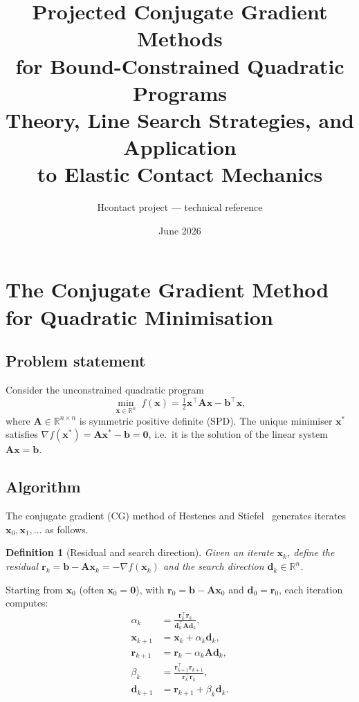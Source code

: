 \documentclass[11pt,a4paper]{article}
\newtheorem{definition}[theorem]{Definition}
\newcommand{\R}{\mathbb{R}}
\newcommand{\bA}{\mathbf{A}}
\newcommand{\bb}{\mathbf{b}}
\newcommand{\br}{\mathbf{r}}
\newcommand{\bd}{\mathbf{d}}
\newcommand{\bx}{\mathbf{x}}
\newcommand{\bzero}{\mathbf{0}}
\newcommand{\tr}{\top}
\begin{document}
\title{\textbf{Projected Conjugate Gradient Methods\\
       for Bound-Constrained Quadratic Programs}\\[0.5em]
       \large Theory, Line Search Strategies, and Application\\
       to Elastic Contact Mechanics}
\author{Hcontact project --- technical reference}
\date{June 2026}
\maketitle
\tableofcontents

\section{The Conjugate Gradient Method for Quadratic Minimisation}
\label{sec:cg}

\subsection{Problem statement}

Consider the unconstrained quadratic program
\begin{equation}
  \min_{\bx \in \R^n}\; f(\bx) = \tfrac{1}{2}\bx^\tr \bA \bx - \bb^\tr \bx,
  \label{eq:qp}
\end{equation}
where $\bA \in \R^{n \times n}$ is symmetric positive definite (SPD).
The unique minimiser $\bx^*$ satisfies $\nabla f(\bx^*) = \bA\bx^* - \bb = \bzero$,
i.e.\ it is the solution of the linear system $\bA\bx = \bb$.

\subsection{Algorithm}

The conjugate gradient (CG) method of Hestenes and Stiefel~\cite{HestStief1952}
generates iterates $\bx_0, \bx_1, \ldots$ as follows.

\begin{definition}[Residual and search direction]
  Given an iterate $\bx_k$, define the \emph{residual} $\br_k = \bb - \bA\bx_k = -\nabla f(\bx_k)$
  and the \emph{search direction} $\bd_k \in \R^n$.
\end{definition}

Starting from $\bx_0$ (often $\bx_0 = \bzero$), with $\br_0 = \bb - \bA\bx_0$ and
$\bd_0 = \br_0$, each iteration computes:
\begin{align}
  \alpha_k   &= \frac{\br_k^\tr \br_k}{\bd_k^\tr \bA \bd_k},
              \label{eq:cg-alpha}\\[4pt]
  \bx_{k+1} &= \bx_k + \alpha_k \bd_k,
              \label{eq:cg-x}\\[4pt]
  \br_{k+1} &= \br_k - \alpha_k \bA \bd_k,
              \label{eq:cg-r}\\[4pt]
  \beta_k    &= \frac{\br_{k+1}^\tr \br_{k+1}}{\br_k^\tr \br_k},
              \label{eq:cg-beta-FR}\\[4pt]
  \bd_{k+1} &= \br_{k+1} + \beta_k \bd_k.
              \label{eq:cg-d}
\end{align}
\end{document}
